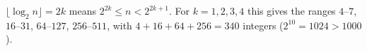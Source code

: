 $\lfloor\log_2n\rfloor=2k$ means $2^{2k}\le n<2^{2k+1}$. For $k=1,2,3,4$ this gives the ranges $4$--$7$, $16$--$31$, $64$--$127$, $256$--$511$, with $4+16+64+256=\boxed{340}$ integers ($2^{10}=1024>1000$).

